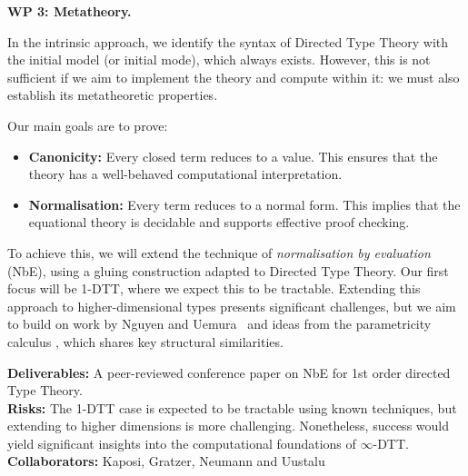 \documentclass[a4paper,11pt]{article}
\renewcommand{\paragraph}[1]{\textbf{#1.}}
\begin{document}



\paragraph{WP 3: Metatheory}

In the intrinsic approach, we identify the syntax of Directed Type
Theory with the initial model (or initial mode), which always
exists. However, this is not sufficient if we aim to implement the
theory and compute within it: we must also establish its metatheoretic
properties.

Our main goals are to prove:
\begin{itemize}
\item \textbf{Canonicity:} Every closed term reduces to a value. This
  ensures that the theory has a well-behaved computational
  interpretation.
\item \textbf{Normalisation:} Every term reduces to a normal
  form. This implies that the equational theory is decidable and
  supports effective proof checking.
\end{itemize}

To achieve this, we will extend the technique of \emph{normalisation
  by evaluation} (NbE), using a gluing construction adapted to
Directed Type Theory. Our first focus will be 1-DTT, where we expect
this to be tractable. Extending this approach to higher-dimensional
types presents significant challenges, but we aim to build on
work by Nguyen and Uemura~\cite{uemura:2025} and ideas
from the parametricity calculus \cite{popl-paper}, which shares key structural
similarities.

\textbf{Deliverables:} A peer-reviewed conference paper on 
NbE for 1st order directed Type Theory.\\
\textbf{Risks:} The 1-DTT case is expected to be tractable using known
techniques, but extending to higher dimensions is more
challenging. Nonetheless, success would yield significant insights
into the computational foundations of $\infty$-DTT.\\
\textbf{Collaborators:} Kaposi, Gratzer, Neumann and Uustalu
\end{document}
